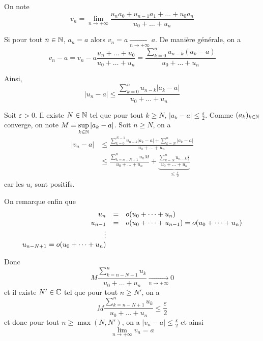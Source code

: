 \begin{solution}
	On note 
	$$v_{n}=\lim\limits_{n\to+\infty}\frac{u_{n}a_{0}+u_{n-1}a_{1}+\dots+u_{0}a_{n}}{u_{0}+\dots+u_{n}}$$

	Si pour tout $n\in\mathbb{N}$, $a_{n}=a$ alors $v_{n}=a\xrightarrow[n\to+\infty]{}a$. De manière générale, on a 
	$$v_{n}-a=v_{n}-a\frac{u_{n}+\dots+u_{0}}{u_{0}+\dots+u_{n}}=\frac{\sum_{k=0}^{n}u_{n-k}(a_{k}-a)}{u_{0}+\dots+u_{n}}$$

	Ainsi,
	$$\vert u_{n}-a\vert\leqslant\frac{\sum_{k=0}^{n}u_{n-k}\vert a_{k}-a\vert}{u_{0}+\dots+u_{n}}$$

	Soit $\varepsilon>0$. Il existe $N\in\mathbb{N}$ tel que pour tout $k\geqslant N$, $\vert a_{k}-a\vert\leqslant\frac{\varepsilon}{2}$. Comme $(a_{k})_{k\in\mathbb{N}}$ converge, on note $M=\sup\limits_{k\in\mathbb{N}}\vert a_{k}-a\vert$. Soit $n\geqslant N$, on a 
	\begin{align*}
		\vert v_{n}-a\vert
		&\leqslant\frac{\sum_{k=0}^{N-1}u_{n-k}\vert a_{k}-a\vert+\sum_{k=N}^{n}\vert a_{k}-a\vert}{u_{0}+\dots+u_{n}}\\
		&\leqslant\frac{\sum_{k=n-N+1}^{n}u_{k}M}{u_{0}+\dots+u_{n}}+\underbrace{\frac{\sum_{k=N}^{n}u_{n-k}\frac{\varepsilon}{2}}{u_{0}+\dots+u_{n}}}_{\leqslant\frac{\varepsilon}{2}}
	\end{align*}
	car les $u_{i}$ sont positifs.

	On remarque enfin que 
	$$
	\begin{array}[]{rcl}
		u_{n} &=& o(u_{0}+\dots+u_{n})\\
		u_{n-1} &=& o(u_{0}+\dots+u_{n-1})=o(u_{0}+\dots+u_{n})\\
		\vdots & &\\
		u_{n-N+1}=o(u_{0}+\dots+u_{n})
	\end{array}
	$$

	Donc 
	$$M\frac{\sum_{k=n-N+1}^{n}u_{k}}{u_{0}+\dots+u_{n}}\xrightarrow[n\to+\infty]{}0$$
	et il existe $N'\in\mathbb{C}$ tel que pour tout $n\geqslant N'$, on a 
	$$M\frac{\sum_{k=n-N+1}^{n}u_{k}}{u_{0}+\dots+u_{n}}\leqslant\frac{\varepsilon}{2}$$
	et donc pour tout $n\geqslant\max(N,N')$, on a $\vert v_{n}-a\vert\leqslant\frac{\varepsilon}{2}$ et ainsi 
	$$\boxed{\lim\limits_{n\to+\infty}v_{n}=a}$$
\end{solution}

